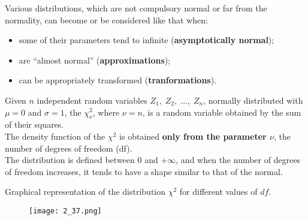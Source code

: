 \begin{frame}
  \vspace*{.5cm}
  Various distributions, which are not compulsory normal or far from the normality, can become or be considered like that when:
  \vspace*{.5cm}
  \begin{itemize}
    \item some of their parameters tend to infinite (\textbf{asymptotically normal});
    \vspace*{.5cm}
    \item are ``almost normal'' (\textbf{approximations});
    \vspace*{.5cm}
    \item can be appropriately transformed  (\textbf{tranformations}).
\end{itemize}
\end{frame}


\begin{frame}
  \vspace*{.5cm}
  Given $ n $ independent random variables $ Z_1,\;  Z_2,\;  \dots,\; Z_n $, normally distributed with $ \mu = 0 $ and $ \sigma = 1 $, the {\boldmath $ \chi_\nu^2 $}, where $ \nu = n $, is a random variable obtained by the sum of their squares.\\
  \vspace*{1cm}
  The density function of the $ \chi^2 $ is obtained \textbf{only from the parameter {\boldmath $ \nu $}}, the number of degrees of freedom (df).\\
  \vspace*{1cm}
  The distribution is defined between $ 0 $ and $ +\infty $, and when the number of degrees of freedom increases, it tends to have a shape similar to that of the normal.
\end{frame}

\begin{frame}
  \vspace*{.5cm}
  \centering
  Graphical representation of the distribution $ \chi^2 $ for different values of $ df $.\\
  \begin{figure}
    \texttt{[image: 2\_37.png]}
  \end{figure}
\end{frame}



